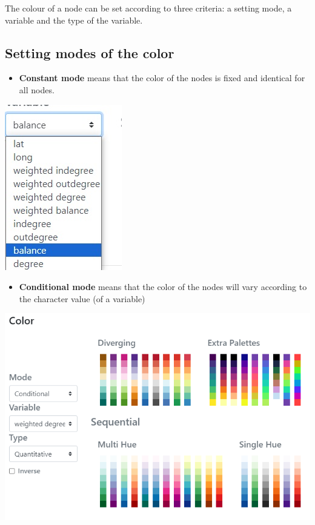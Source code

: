 \documentclass[
  letterpaper,
  DIV=11,
  numbers=noendperiod]{scrreprt}
\providecommand{\tightlist}{%
  \setlength{\itemsep}{0pt}\setlength{\parskip}{0pt}}\usepackage{longtable,booktabs,array}
\begin{document}
The colour of a node can be set according to three criteria: a setting
mode, a variable and the type of the variable.

\subsection{Setting modes of the
color}\label{setting-modes-of-the-color}

\begin{itemize}
\tightlist
\item
  \textbf{Constant mode} means that the color of the nodes is fixed and
  identical for all nodes.
\end{itemize}

\includegraphics{images/Nodes_color_constant.png}

\begin{itemize}
\tightlist
\item
  \textbf{Conditional mode} means that the color of the nodes will vary
  according to the character value (of a variable)
\end{itemize}

\begin{center}
\includegraphics{images/Nodes_color_conditionnal.PNG}
\end{center}
\end{document}
